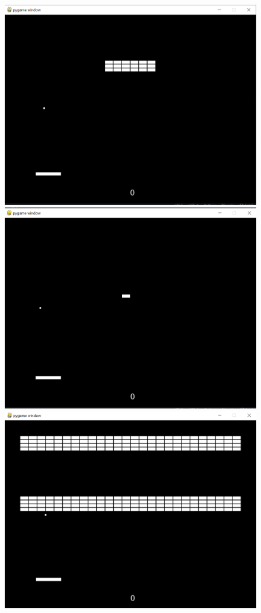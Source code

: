 \documentclass[twoside,11pt]{article}
\begin{document}
\begin{figure}[H]
\includegraphics[scale=0.2]{layout2}
\includegraphics[scale=0.2]{layout3}
\includegraphics[scale=0.2]{layout4}

\end{figure}
\end{document}
